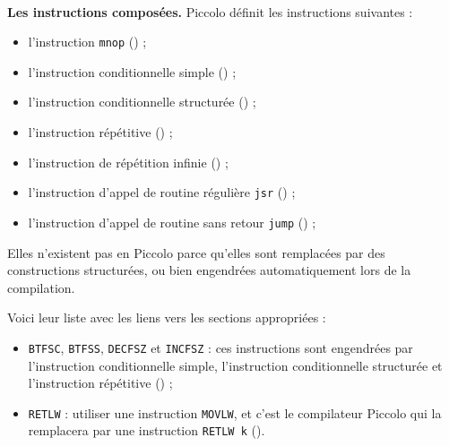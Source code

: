 ~\\
\textbf{Les instructions composées.} Piccolo définit les instructions suivantes :
\begin{itemize}
  \item l'instruction \texttt{mnop} () ;
  \item l'instruction conditionnelle simple () ;
  \item l'instruction conditionnelle structurée () ;
  \item l'instruction répétitive () ;
  \item l'instruction de répétition infinie () ;
  \item l'instruction d'appel de routine régulière \texttt{jsr} () ;
  \item l'instruction d'appel de routine sans retour \texttt{jump} () ;
\end{itemize}





Elles n’existent pas en Piccolo parce qu’elles sont remplacées par des constructions structurées, ou bien engendrées automatiquement lors de la compilation.

Voici leur liste avec les liens vers les sections appropriées :\begin{itemize}
  \item \texttt{BTFSC}, \texttt{BTFSS}, \texttt{DECFSZ} et \texttt{INCFSZ} : ces instructions sont engendrées par l’instruction conditionnelle simple, l’instruction conditionnelle structurée et l’instruction répétitive () ;
  \item \texttt{RETLW} : utiliser une instruction \texttt{MOVLW}, et c’est le compilateur Piccolo qui la remplacera par une instruction \texttt{RETLW k} ().

\end{itemize}







